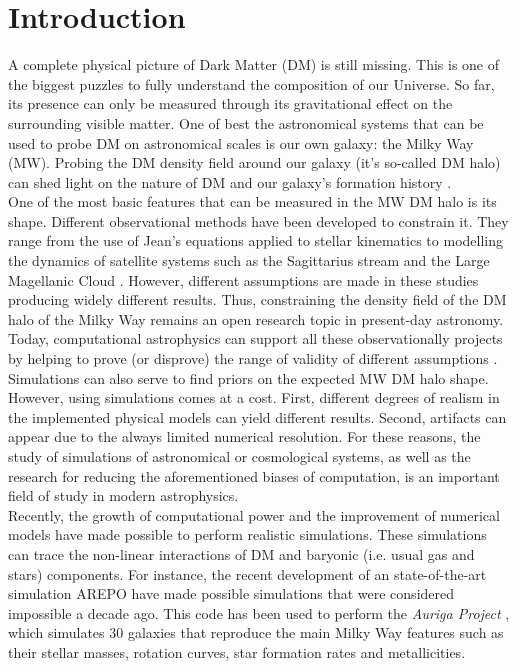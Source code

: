 \chapter{Introduction}

A complete physical picture of Dark Matter (DM) is still missing.
This is one of the biggest puzzles to fully understand the composition of our Universe.
So far, its presence can only be measured through its gravitational effect on the surrounding visible matter. 
One of best the astronomical systems that can be used to probe DM on astronomical scales is our own galaxy: the Milky Way (MW).
Probing the DM density field around our galaxy (it's so-called DM halo) can shed light on the nature of DM \cite{Nipoti,ReadMoore} and our
galaxy's formation history \cite{Read1,Read2,Vera-Ciro2011}.\\

One of the most basic features that can be measured in the MW DM halo is its shape. 
Different observational methods have been developed to constrain it. 
They range from the use of Jean's equations applied to stellar kinematics \cite{Loebman2012} to modelling the dynamics of satellite
systems such as the Sagittarius stream and the Large Magellanic Cloud \cite{Vera-Ciro2013,Deg2012,LawMajewski2010}. 
However, different assumptions are made in these studies producing widely different results.
Thus, constraining the density field of the DM halo of the Milky Way remains an open research topic in present-day astronomy.\\ 

Today, computational astrophysics can support all these observationally projects by helping to prove (or disprove) the range of validity of different assumptions \cite{prove,bardeen,Vera-Ciro2011}.
Simulations can also serve to find priors on the expected MW DM halo shape.
However, using simulations comes at a cost.
First, different degrees of realism in the implemented physical models can yield different results.
Second, artifacts can appear due to the always limited numerical resolution. 
For these reasons, the study of simulations of astronomical or cosmological systems, as well as the research for reducing the aforementioned biases of computation, is an important field of study in modern astrophysics.\\

Recently, the growth of computational power and the improvement of numerical models have made possible to perform realistic simulations.
These simulations can trace the non-linear interactions of DM and baryonic (i.e. usual gas and stars) components. 
For instance, the recent development of an state-of-the-art simulation AREPO \cite{arepo} have made possible simulations that were considered impossible a decade ago.
This code has been used to perform the \emph{Auriga Project} \cite{auriga}, which simulates 30 galaxies that reproduce the main Milky Way features such as their stellar masses, rotation curves, star formation rates and metallicities.\\

